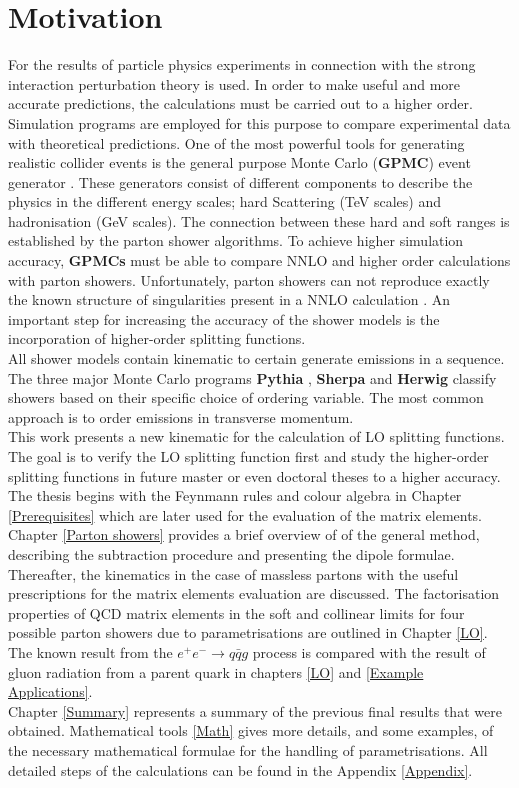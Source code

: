 \section*{Motivation}
For the results of particle physics experiments in connection with the strong interaction perturbation theory is used. In order to make useful and more accurate predictions, the calculations must be carried out to a higher order.\\ Simulation programs are employed for this purpose to compare experimental data with theoretical predictions. One of the most powerful tools for generating realistic collider events is the general purpose Monte Carlo (\textbf{GPMC}) event generator \cite{Buckley:2011ms}. These generators consist of different components to describe the physics in the different energy scales; hard Scattering (TeV scales) and hadronisation (GeV scales). The connection between these hard and soft ranges is established by the parton shower algorithms. To achieve higher simulation accuracy, \textbf{GPMCs} must be able to compare NNLO and higher order calculations with parton showers. Unfortunately, parton showers can not reproduce exactly the known structure of singularities present in a NNLO calculation \cite{Dasgupta:2018nvj}.
An important step for increasing the accuracy of the shower models is the incorporation of higher-order splitting functions. \\
All shower models contain kinematic to certain generate emissions in a sequence. The three major Monte Carlo programs \textbf{Pythia} \cite{Sjostrand:2006za} \cite{Sjostrand:2014zea}, \textbf{Sherpa} \cite{Gleisberg:2008ta} and \textbf{Herwig} \cite{Platzer:2009jq} \cite{Bellm:2015jjp} classify showers based on their specific choice of ordering variable.  The most common approach is to order emissions in transverse momentum.\\
 This work presents a new kinematic for the calculation of LO splitting functions. The goal is to verify the LO splitting function first and study the higher-order splitting functions in future master or even doctoral theses to a higher accuracy. The thesis begins with the Feynmann rules and colour algebra in Chapter \ref{Prerequisites} which are later used for the evaluation of the matrix elements.
Chapter \ref{Parton showers} provides a brief overview of of the general method, describing the subtraction procedure and presenting the dipole formulae. Thereafter, the kinematics in the case of massless  partons with the useful prescriptions for the matrix elements evaluation are discussed. The factorisation properties of QCD matrix elements in the soft and collinear limits for four possible parton showers due to parametrisations are outlined in Chapter \ref{LO}. The known result from the $ e^{+}e^{-} \rightarrow q \bar{q} g $ process is compared with the result of gluon radiation from a parent quark in chapters \ref{LO} and \ref{Example Applications}. \\
Chapter \ref{Summary} represents  a  summary  of  the  previous final results  that  were  obtained. Mathematical tools \ref{Math} gives more details, and some examples, of the necessary mathematical formulae for the handling of parametrisations. All detailed steps of the calculations can be found in the Appendix \ref{Appendix}.

 